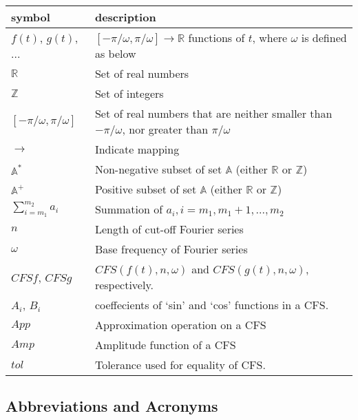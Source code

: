 \documentclass[12pt]{article}
\begin{document}
\renewcommand{\arraystretch}{1.2}
\noindent \begin{longtable*}{l l} \toprule
\textbf{symbol} & \textbf{description}\\
\midrule 
$f(t)$, $g(t)$, ... & $[-\pi/\omega, \pi/\omega]\rightarrow\mathbb{R}$ 
functions of $t$, where $\omega$ is defined as below\\
$\mathbb{R}$ & Set of real numbers\\
$\mathbb{Z}$ & Set of integers\\
$[-\pi/\omega, \pi/\omega]$ & Set of real numbers that are neither smaller 
than $-\pi/\omega$, nor greater than $\pi/\omega$ \\
$\rightarrow$ & Indicate mapping\\
$\mathbb{A}^{*}$ & Non-negative subset of set $\mathbb{A}$ (either $\mathbb{R}$ 
or $\mathbb{Z}$)\\
$\mathbb{A}^{+}$ & Positive subset of set $\mathbb{A}$ (either $\mathbb{R}$ 
or $\mathbb{Z}$)\\
$\sum_{i=m_1}^{m_2}a_i$ & Summation of $a_i, i=m_1, m_1+1, ..., m_2$\\
$n$ & Length of cut-off Fourier series\\ 
$\omega$ & Base frequency of Fourier series \\
$\mathit{CFSf}$, $\mathit{CFSg}$ & $\mathit{CFS}(f(t), n, \omega)$ and 
$\mathit{CFS}(g(t), n, \omega)$, respectively.\\
$A_i$, $B_i$& coeffecients of `sin' and `cos' functions in a CFS.\\
$\mathit{App}$& Approximation operation on a CFS\\
$\mathit{Amp}$& Amplitude function of a CFS\\
$\mathit{tol}$& Tolerance used for equality of CFS.\\
\bottomrule
\end{longtable*}

\subsection{Abbreviations and Acronyms}
\end{document}
